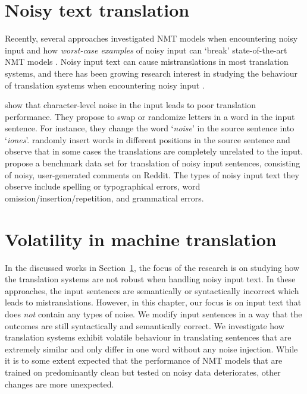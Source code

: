 \section{Noisy text translation} \label{isitanothernoise}

Recently, several approaches investigated NMT models when encountering noisy input and how \textit{worst-case examples} of noisy input can `break' state-of-the-art NMT models \citep{D18-1050}. 
Noisy input text can cause mistranslations in most translation systems, and there has been growing research interest in studying the behaviour of translation systems when encountering noisy input \citep{li-EtAl:2019:WMT1}.

\citet{DBLP:journals/corr/abs-1711-02173} show that character-level noise in the input %
leads to poor translation performance.
They propose to swap or randomize letters in a word in the input sentence. For instance, they change the word `\textit{noise}' in the source sentence into `\textit{iones}'.
\citet{halluc} randomly insert words in different positions in the source sentence and observe that in some cases the translations are completely unrelated to the input. 
\citet{D18-1050} propose a benchmark data set for translation of noisy input sentences, consisting of noisy, user-generated comments on Reddit.
The types of noisy input text they observe include spelling or typographical errors, word omission/insertion/repetition, and grammatical errors.


\section{Volatility in machine translation} \label{secvol}

In the discussed works in Section~\ref{isitanothernoise}, the focus of the research is on studying how the translation systems are not robust when handling noisy input text. In these approaches, the input sentences are semantically or syntactically incorrect which leads to mistranslations. 
However, in this chapter, our focus is on input text that does \textit{not} contain any types of noise. We modify input sentences in a way that the outcomes are still syntactically and semantically correct. 
We investigate how translation systems exhibit volatile behaviour in translating sentences that are extremely similar and only differ in one word without any noise injection.
While it is to some extent expected that the performance of NMT models that are trained on predominantly clean but tested on noisy data deteriorates, other changes are more unexpected.


